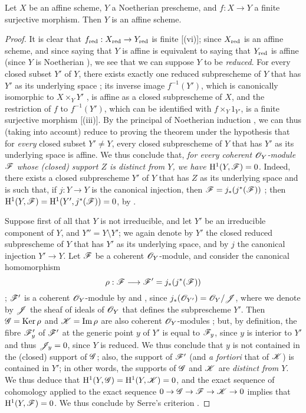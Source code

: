 \begin{theorem}[6.7.1]
\label{II.6.7.1}
Let $X$ be an affine scheme, $Y$ a Noetherian prescheme, and $f:X\to Y$ a finite surjective morphism.
Then $Y$ is an affine scheme.
\end{theorem}

\begin{proof}
It is clear that $f_\red:X_\red\to Y_\red$ is finite [(vi)];
since $X_{\mathrm{red}}$ is an affine scheme, and since saying that $Y$ is affine is equivalent to saying that $Y_{\mathrm{red}}$ is affine (since $Y$ is Noetherian ), we see that we can suppose $Y$ to be \emph{reduced}.
For every closed subset $Y'$ of $Y$, there exists exactly one reduced subprescheme of $Y$ that has $Y'$ as its underlying space ;
its inverse image $f^{-1}(Y')$, which is canonically isomorphic to $X\times_Y Y'$ , is affine as a closed subprescheme of $X$, and the restriction of $f$ to $f^{-1}(Y')$, which can be identified with $f\times_Y 1_{Y'}$, is a finite surjective morphism [(iii)].
By the principal of Noetherian induction , we can thus (taking  into account) reduce to proving the theorem under the hypothesis that for \emph{every} closed subset $Y'\neq Y$, every closed subprescheme of $Y$ that has $Y'$ as its underlying space is affine.
We thus conclude that, \emph{for every coherent $\mathscr{O}_Y$-module $\mathscr{F}$ whose (closed) support $Z$ is distinct from $Y$, we have $\mathrm{H}^1(Y,\mathscr{F})=0$}.
Indeed, there exists a closed subprescheme $Y'$ of $Y$ that has $Z$ as its underlying space and is such that, if $j:Y\to Y$ is the canonical injection, then $\mathscr{F}=j_*(j^*(\mathscr{F}))$ ;
then  $\mathrm{H}^1(Y,\mathscr{F})=\mathrm{H}^1(Y',j^*(\mathscr{F}))=0$, by .

Suppose first of all that $Y$ is not irreducible, and let $Y'$ be an irreducible component of $Y$, and $Y''=Y\setminus Y'$;
we again denote by $Y'$ the closed reduced subprescheme of $Y$ that has $Y'$ as its underlying space, and by $j$ the canonical injection $Y'\to Y$.
Let $\mathscr{F}$ be a coherent $\mathscr{O}_Y$-module, and consider the canonical homomorphism
\[
  \rho : \sh{F}\to\sh{F}' = j_*(j^*(\sh{F}))
\]
;
$\mathscr{F}'$ is a coherent $\mathscr{O}_Y$-module by  and , since $j_*(\mathscr{O}_{Y'})=\mathscr{O}_Y/\mathscr{J}$, where we denote by $\mathscr{J}$ the sheaf of ideals of $\mathscr{O}_Y$ that defines the subprescheme $Y'$.
Then $\mathscr{G}=\operatorname{Ker}\rho$ and $\mathscr{K}=\operatorname{Im}\rho$ are also coherent $\mathscr{O}_Y$-modules ;
but, by definition, the fibre $\mathscr{F}'_y$ of $\mathscr{F}'$ at the generic point $y$ of $Y'$ is equal to $\mathscr{F}_y$, since $y$ is interior to $Y'$ and thus $\mathscr{J}_y=0$, since $Y$ is reduced.
We thus conclude that $y$ is not contained in the (closed) support of $\mathscr{G}$;
also, the support of $\mathscr{F}'$ (and \emph{a fortiori} that of $\mathscr{K}$) is contained in $Y'$;
in other words, the supports of $\mathscr{G}$ and $\mathscr{K}$ are \emph{distinct from $Y$}.
We thus deduce that $\mathrm{H}^1(Y,\mathscr{G})=\mathrm{H}^1(Y,\mathscr{K})=0$, and the exact sequence of cohomology applied to the exact sequence $0\to\sh{G}\to\sh{F}\to\sh{K}\to0$ implies that $\mathrm{H}^1(Y,\mathscr{F})=0$.
We thus conclude by Serre's criterion .


\end{proof}
